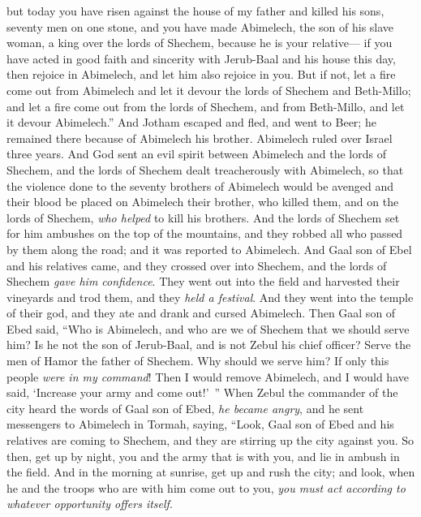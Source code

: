 \begin{biblechapter}
\verse but today you have risen against the house of my father and killed his sons, seventy men on one stone, and you have made Abimelech, the son of his slave woman, a king over the lords of Shechem, because he is your relative—
\verse if you have acted in good faith and sincerity with Jerub-Baal and his house this day, then rejoice in Abimelech, and let him also rejoice in you.
\verse But if not, let a fire come out from Abimelech and let it devour the lords of Shechem and Beth-Millo; and let a fire come out from the lords of Shechem, and from Beth-Millo, and let it devour Abimelech.”
\verse And Jotham escaped and fled, and went to Beer; he remained there because of Abimelech his brother.
 Abimelech ruled over Israel three years.
\verse And God sent an evil spirit between Abimelech and the lords of Shechem, and the lords of Shechem dealt treacherously with Abimelech,
\verse so that the violence done to the seventy brothers of Abimelech would be avenged and their blood be placed on Abimelech their brother, who killed them, and on the lords of Shechem, \textit{who helped} to kill his brothers.
\verse And the lords of Shechem set for him ambushes on the top of the mountains, and they robbed all who passed by them along the road; and it was reported to Abimelech.
\verse And Gaal son of Ebel and his relatives came, and they crossed over into Shechem, and the lords of Shechem \textit{gave him confidence}.
\verse They went out into the field and harvested their vineyards and trod them, and they \textit{held a festival}. And they went into the temple of their god, and they ate and drank and cursed Abimelech.
\verse Then Gaal son of Ebed said, “Who is Abimelech, and who are we of Shechem that we should serve him? Is he not the son of Jerub-Baal, and is not Zebul his chief officer? Serve the men of Hamor the father of Shechem. Why should we serve him?
\verse If only this people \textit{were in my command}! Then I would remove Abimelech, and I would have said, ‘Increase your army and come out!’ ”
\verse When Zebul the commander of the city heard the words of Gaal son of Ebed, \textit{he became angry},
\verse and he sent messengers to Abimelech in Tormah, saying, “Look, Gaal son of Ebed and his relatives are coming to Shechem, and they are stirring up the city against you.
\verse So then, get up by night, you and the army that is with you, and lie in ambush in the field.
\verse And in the morning at sunrise, get up and rush the city; and look, when he and the troops who are with him come out to you, \textit{you must act according to whatever opportunity offers itself}.

\end{biblechapter}
